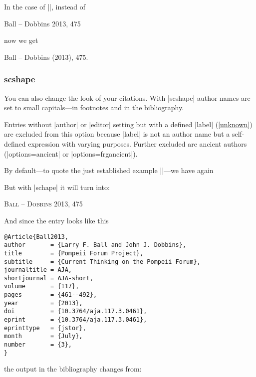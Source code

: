 \documentclass[a4paper,
10pt,
greek,
french,
spanish,
italian,
ngerman,
english
]{ltxdoc}
\begin{document}
In the case of |\cite[475]{Ball2013}|, instead of
\begin{bsp} 
Ball – Dobbins 2013, 475 
\end{bsp}

now we get

\begin{bsp}
Ball – Dobbins {\color{red}(}2013{\color{red})}, 475.
\end{bsp}


\subsubsection{scshape}\label{scshape}
You can also change the look of your citations. With |scshape| author names are set to small capitals---in footnotes and in the bibliography.

Entries without |author| or |editor| setting but with a defined |label| (\cref{unknown}) are excluded from this option
because |label| is not an author name but a self-defined expression with varying purposes.
Further excluded are ancient authors (|options={ancient}| or |options={frgancient}|).

By default---to quote the just established example |\cite[475]{Ball2013}|---we have again

\begin{bsp} \cite[475]{Ball2013} \end{bsp}

But with |schape| it will turn into:

\begin{bsp}
{\scshape {\color{red}Ball – Dobbins}} 2013, 475
\end{bsp}

And since the entry looks like this

\begin{lstlisting}[style=bibentry,label=Ball2013,caption={{@}Article\{Ball2013,…\} }]
@Article{Ball2013,
author       = {Larry F. Ball and John J. Dobbins},
title        = {Pompeii Forum Project},
subtitle     = {Current Thinking on the Pompeii Forum},
journaltitle = AJA,
shortjournal = AJA-short,
volume       = {117},
pages        = {461--492},
year         = {2013},
doi          = {10.3764/aja.117.3.0461},
eprint       = {10.3764/aja.117.3.0461},
eprinttype   = {jstor},
month        = {July},
number       = {3},
}
\end{lstlisting}


the output in the bibliography changes from:
\end{document}
